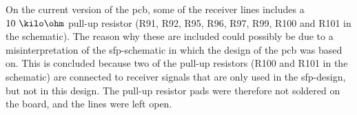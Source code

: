 \documentclass[main.tex]{subfiles}
\begin{document}
On the current version of the \gls{pcb}, some of the receiver lines includes a $10~\kilo\ohm$ pull-up resistor (R91, R92, R95, R96, R97, R99, R100 and R101 in the schematic). The reason why these are included could possibly be due to a misinterpretation of the \gls{sfp}-schematic in which the design of the \gls{pcb} was based on. This is concluded because two of the pull-up resistors (R100 and R101 in the schematic) are connected to receiver signals that are only used in the \gls{sfp}-design, but not in this design. The pull-up resistor pads were therefore not soldered on the board, and the lines were left open.


\end{document}
